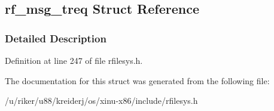 \hypertarget{structrf__msg__treq}{}\subsection{rf\+\_\+msg\+\_\+treq Struct Reference}
\label{structrf__msg__treq}


\subsubsection{Detailed Description}


Definition at line 247 of file rfilesys.\+h.



The documentation for this struct was generated from the following file\+:\begin{DoxyCompactItemize}
\item 
/u/riker/u88/kreiderj/os/xinu-\/x86/include/rfilesys.\+h\end{DoxyCompactItemize}
